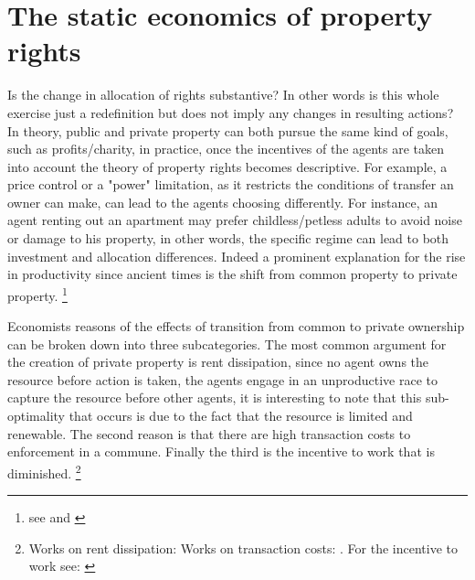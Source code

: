 \documentclass[12pt]{article}
\numberwithin{equation}{section}
\begin{document}
\section{The static economics of property rights}

Is the change in allocation of rights substantive? In other words is this whole exercise just a redefinition but does not imply any changes in resulting actions? In theory, public and private property can both pursue the same kind of goals, such as profits/charity, in practice, once the incentives of the agents are taken into account the theory of property rights becomes descriptive. For example, a price control or a "power" limitation, as it restricts the conditions of transfer an owner can make, can lead to the agents choosing differently. For instance, an agent renting out an apartment may prefer childless/petless adults to avoid noise or damage to his property, in other words, the specific regime can lead to both investment and allocation differences. Indeed a prominent explanation for the rise in productivity since ancient times is the shift from common property to private property. \footnote{see \cite{anderson1983privatizing} and \cite{north1973rise}}

Economists reasons of the effects of transition from common to private ownership can be broken down into three subcategories. The most common argument for the creation of private property is rent dissipation, since no agent owns the resource before action is taken, the agents engage in an unproductive race to capture the  resource before other agents, it is interesting to note that this sub-optimality that occurs is due to the fact that the resource is limited and renewable. The second reason is that there are high transaction costs to enforcement in a commune. Finally the third is the incentive to work that is diminished.  \footnote{ Works on rent dissipation:\cite{dasgupta1979economic} \cite{gordon1954economic} \cite{Cheung1970} \cite{schaefer1957some} \cite{scott1955fishery} \cite{clark1990optimal} Works on transaction costs: \cite{coase1960problem} \cite{demsetz1983structure}. For the incentive to work see: \cite{north1990} }
\end{document}
